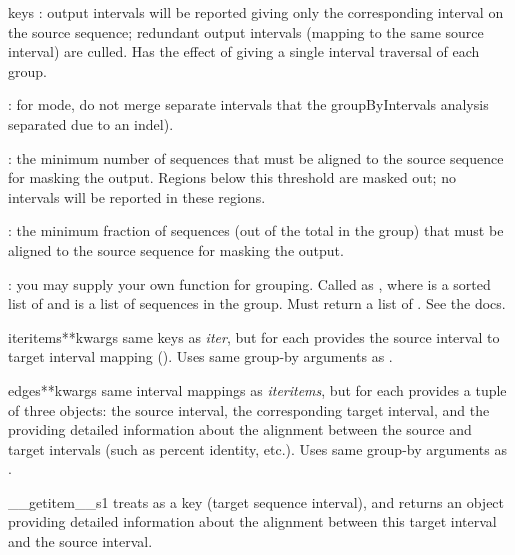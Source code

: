 \documentclass{howto}
\begin{document}
\begin{funcdesc}{keys}
  : output intervals will be reported giving only
  the corresponding interval on the source sequence; redundant
  output intervals (mapping to the same source interval) are
  culled.  Has the effect of giving a single interval traversal
  of each group.

  : for  mode, do not merge separate 
  intervals that the groupByIntervals analysis separated due to an indel).

  : the minimum number of sequences that must be aligned to
  the source sequence for masking the output.  Regions below
  this threshold are masked out; no intervals will be reported
  in these regions.

  : the minimum fraction of sequences (out of the
  total in the group) that must be aligned to the source
  sequence for masking the output.

  : you may supply your own function for grouping.
  Called as , where
   is a sorted list of
  and  is a list of sequences in the group.
  Must return a list of .  See the docs.

\end{funcdesc}


\begin{funcdesc}{iteritems}{**kwargs}
  same keys as {\em iter}, but for each provides the source interval
  to target interval mapping ().
  Uses same group-by arguments as .
\end{funcdesc}


\begin{funcdesc}{edges}{**kwargs}
  same interval mappings as {\em iteritems}, but for
  each provides a tuple of three objects:
  the source interval, the corresponding target interval,
  and the  providing detailed
  information about the alignment between the source and target intervals
  (such as percent identity, etc.).
  Uses same group-by arguments as .
\end{funcdesc}


\begin{funcdesc}{__getitem__}{s1}
  treats  as a key (target sequence
  interval), and returns an  object providing detailed
  information about the alignment between this target interval
  and the source interval.
\end{funcdesc}
\end{document}
